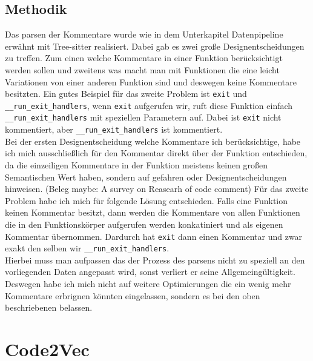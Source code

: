 \documentclass[12pt,letterpaper,ngerman]{article}
\begin{document}
\subsection{Methodik} 
Das parsen der Kommentare wurde wie in dem Unterkapitel Datenpipeline erwähnt 
mit Tree-sitter realisiert. Dabei gab es zwei große Designentscheidungen zu treffen.
Zum einen welche Kommentare in einer Funktion berücksichtigt werden sollen und
zweitens was macht man mit Funktionen die eine leicht Variationen von einer
anderen Funktion sind und deswegen keine Kommentare besitzten. Ein gutes Beispiel
für das zweite Problem ist \verb|exit| und \verb|__run_exit_handlers|, wenn
\verb|exit| aufgerufen wir, ruft diese Funktion einfach 
\verb|__run_exit_handlers| mit speziellen Parametern auf. Dabei ist \verb|exit|
nicht kommentiert, aber \verb|__run_exit_handlers| ist kommentiert.\\
{\color{red} Bei der ersten Designentscheidung welche Kommentare ich berücksichtige,
habe ich mich ausschließlich für den Kommentar direkt über der Funktion 
entschieden, da die einzeiligen Kommentare in der Funktion meistens keinen
großen Semantischen Wert haben, sondern auf gefahren oder Designentscheidungen
 hinweisen. (Beleg maybe: A survey on Reasearh of code comment)} Für das zweite Problem habe ich mich für folgende Lösung entschieden.
Falls eine Funktion keinen Kommentar besitzt, dann werden die Kommentare von
allen Funktionen die in den Funktionskörper aufgerufen werden konkatiniert und
als eigenen Kommentar übernommen. Dardurch hat \verb|exit| dann einen Kommentar
und zwar exakt den selben wir \verb|__run_exit_handlers|.\\
Hierbei muss man aufpassen das der Prozess des parsens nicht zu speziell an
den vorliegenden Daten angepasst wird, sonst verliert er seine Allgemeingültigkeit.
Deswegen habe ich mich nicht auf weitere Optimierungen die ein wenig mehr Kommentare
erbrignen könnten eingelassen, sondern es bei den oben beschriebenen belassen.
\section{Code2Vec}
\end{document}

